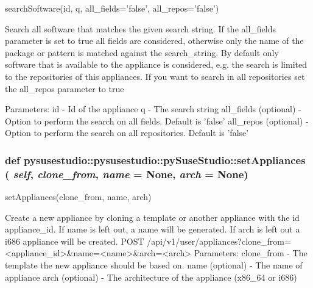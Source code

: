 \label{classpysusestudio_1_1pysusestudio_1_1py_suse_studio_a0d6f95f15e9f44dd258788e43824d8a6}
\begin{DoxyVerb}searchSoftware(id, q, all_fields='false', all_repos='false')

            Search all software that matches the given search string. If the all_fields
            parameter is set to true all fields are considered, otherwise only the name of the package 
            or pattern is matched against the search_string. 
            By default only software that is available to the appliance is considered, e.g. the search is limited to the 
            repositories of this appliances. If you want to search in all repositories set the all_repos parameter to 
            true
            
            Parameters:
id - Id of the appliance
q - The search string 
all_fields (optional) - Option to perform the search on all fields. Default is 'false'
all_repos (optional) - Option to perform the search on all repositories. Default is 'false'

        
\end{DoxyVerb}
 \hypertarget{classpysusestudio_1_1pysusestudio_1_1py_suse_studio_ab0ec1c2ad2ca5c1659c219b131b42248}{
\subsubsection[{setAppliances}]{\setlength{\rightskip}{0pt plus 5cm}def pysusestudio::pysusestudio::pySuseStudio::setAppliances ( {\em self}, \/   {\em clone\_\-from}, \/   {\em name} = {\ttfamily None}, \/   {\em arch} = {\ttfamily None})}}
\label{classpysusestudio_1_1pysusestudio_1_1py_suse_studio_ab0ec1c2ad2ca5c1659c219b131b42248}
\begin{DoxyVerb}setAppliances(clone_from, name, arch)

        Create a new appliance by cloning a template or another appliance with the id appliance_id. 
            If name is left out, a name will be generated. If arch is left out a i686 appliance will be created.  
            POST /api/v1/user/appliances?clone_from=<appliance_id>&name=<name>&arch=<arch>
            Parameters:
clone_from - The template the new appliance should be based on. 
name (optional) - The name of appliance 
arch (optional) - The architecture of the appliance (x86_64 or i686) 

\end{DoxyVerb}
